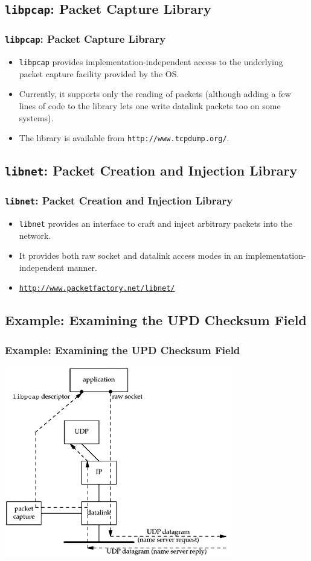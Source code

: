 \documentclass[notes,serif]{beamer}
\begin{document}
\subsection{\texttt{libpcap}: Packet Capture Library}
\begin{frame}
\frametitle{\texttt{libpcap}: Packet Capture Library}
\begin{itemize}
  \item \texttt{libpcap} provides implementation-independent access to the underlying packet capture facility provided by the OS.
  \item Currently, it supports only the reading of packets (although adding a few lines of code to the library lets one write datalink packets too on some systems).
  \item The library is available from \texttt{http://www.tcpdump.org/}.
\end{itemize}
\end{frame}

\subsection{\texttt{libnet}: Packet Creation and Injection Library}
\begin{frame}
\frametitle{\texttt{libnet}: Packet Creation and Injection Library}
\begin{itemize}
  \item \texttt{libnet} provides an interface to craft and inject arbitrary packets into the network.
  \item It provides both raw socket and datalink access modes in an implementation-independent manner.
  \item \href{http://www.packetfactory.net/libnet/}{\tt http://www.packetfactory.net/libnet/}
\end{itemize}
\end{frame}

\subsection{Example: Examining the UPD Checksum Field}
\begin{frame}
\frametitle{Example: Examining the UPD Checksum Field}
  \begin{center}
  \includegraphics[width=.6\textwidth]{figs/29fig03.png}
  \end{center}
\end{frame}
\end{document}
